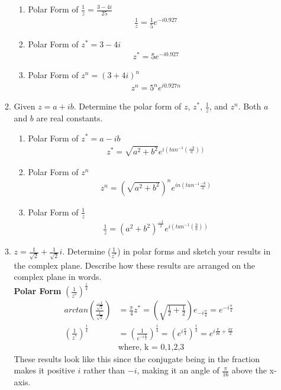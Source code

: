 \documentclass[12pt]{article}
\begin{document}
\begin{enumerate}
\begin{enumerate}
\begin{enumerate}
					\item Polar Form of $\frac{1}{z}=\frac{3-4i}{25}$
						\begin{align*}
						    \frac{1}{z}=\frac{1}{5}e^{-i0.927}
						\end{align*}

					\item Polar Form of $z^{*} = 3-4i$
						\begin{align*}
						    z^{*}=5e^{-i0.927}
						\end{align*}

					\item Polar Form of $z^{n}=(3+4i)^{n}$
						\begin{align*}
						    z^{n}=5^{n}e^{i0.927n}
						\end{align*}
				\end{enumerate}

			\item Given $z=a+ib$. Determine the polar form of $z$, $z^{*}$, $\frac{1}{z}$, and $z^{n}$.  Both $a$ and $b$ are real constants. 	
				\begin{enumerate}
					\item Polar Form of $z^{*}=a-ib$
						\begin{align*}
						    z^{*}=\sqrt{a^{2}+b^{2}}e^{i(tan^{-1}(\frac{-b}{a}))}
						\end{align*}
					\item Polar Form of $z^{n}$
						\begin{align*}
						    z^{n}=(\sqrt{a^{2}+b^{2}})^{n}e^{in(tan^{-1}\frac{-b}{a})}
					\end{align*}
					\item Polar Form of $\frac{1}{z}$
						\begin{align*}
						    \frac{1}{z}=(a^{2}+b^{2})^{\frac{-1}{2}}e^{i(tan^{-1}(\frac{b}{a}))}
						\end{align*}
				\end{enumerate}
		\item $z = \frac{1}{\sqrt{2}} + \frac{1}{{\sqrt{2}}}i$. Determine ($\frac{1}{z^{*}}$) in polar forms and sketch your results in the complex plane. Describe how these results are arranged on the complex plane in words.\\
			\textbf{Polar Form} $(\frac{1}{z^{*}})^{\frac{1}{4}}$
			\begin{align*}
				arctan(\frac{\frac{-1}{\sqrt{2}}}{\frac{1}{\sqrt{2}}})&=\frac{\pi}{4}z^{*}=(\sqrt{\frac{1}{2}+\frac{1}{2}})e_{-i \frac{\pi}{4}} = e^{-i \frac{\pi}{4}}\\
				(\frac{1}{z^{*}})^{\frac{1}{4}}&=(\frac{1}{e^{-i \frac{\pi}{4}}})^{\frac{1}{4}}=(e^{i \frac{\pi}{4}})^{\frac{1}{4}}=e^{i \frac{\pi}{16}+ \frac{k\pi}{2}}\\
							       &\text{where, k = 0,1,2,3}
			\end{align*}
			These results look like this since the conjugate being in the fraction makes it positive $i$ rather than $-i$, making it an angle of $\frac{\pi}{16}$ above the x-axis.
		\end{enumerate}
		

\end{enumerate}
\end{document}
